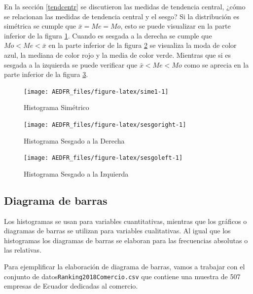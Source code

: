 \documentclass[letterpaper,]{book}
\begin{document}
En la sección \ref{tendcentr} se discutieron las medidas de tendencia central, ¿cómo se relacionan las medidas de tendencia central y el sesgo? Si la distribución es simétrica se cumple que \(\bar{x}=Me=Mo\), esto se puede visualizar en la parte inferior de la figura \ref{fig:sime1}. Cuando es sesgada a la derecha se cumple que \(Mo < Me < \bar{x}\) en la parte inferior de la figura \ref{fig:sesgoright} se visualiza la moda de color azul, la mediana de color rojo y la media de color verde. Mientras que si es sesgada a la izquierda se puede verificar que \(\bar{x} < Me < Mo\) como se aprecia en la parte inferior de la figura \ref{fig:sesgoleft}.

\begin{figure}[h!]

{\centering \texttt{[image: AEDFR\_files/figure-latex/sime1-1]} 

}

\caption{Histograma Simétrico}\label{fig:sime1}
\end{figure}

\begin{figure}[h!]

{\centering \texttt{[image: AEDFR\_files/figure-latex/sesgoright-1]} 

}

\caption{Histograma Sesgado a la Derecha}\label{fig:sesgoright}
\end{figure}

\begin{figure}[h!]

{\centering \texttt{[image: AEDFR\_files/figure-latex/sesgoleft-1]} 

}

\caption{Histograma Sesgado a la Izquierda}\label{fig:sesgoleft}
\end{figure}

\newpage

\hypertarget{diagrama-de-barras}{%
\subsection{Diagrama de barras}\label{diagrama-de-barras}}

Los histogramas se usan para variables cuantitativas, mientras que los gráficos o diagramas de barras se utilizan para variables cualitativas. Al igual que los histogramas los diagramas de barras se elaboran para las frecuencias absolutas o las relativas.

Para ejemplificar la elaboración de diagrama de barras, vamos a trabajar con el conjunto de datos\texttt{Ranking2018Comercio.csv} que contiene una muestra de 507 empresas de Ecuador dedicadas al comercio.
\end{document}
